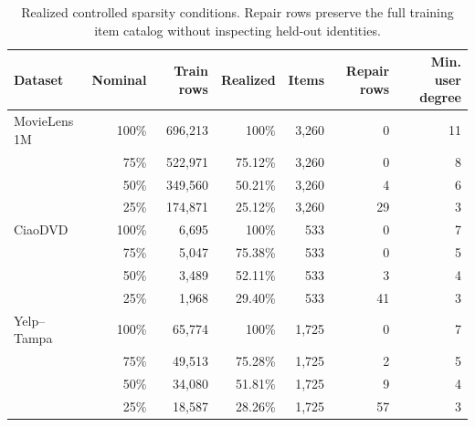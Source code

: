 \begin{table}[H]
\centering
\caption{Realized controlled sparsity conditions. Repair rows preserve the full training item catalog without inspecting held-out identities.}
\label{tab:realized-sparsity}
\small
\begin{tabular}{@{}lrrrrrr@{}}
\toprule
Dataset & Nominal & Train rows & Realized & Items & Repair rows & Min. user degree \\
\midrule
MovieLens 1M & 100\% & 696,213 & 100\% & 3,260 & 0 & 11 \\
 & 75\% & 522,971 & 75.12\% & 3,260 & 0 & 8 \\
 & 50\% & 349,560 & 50.21\% & 3,260 & 4 & 6 \\
 & 25\% & 174,871 & 25.12\% & 3,260 & 29 & 3 \\
\addlinespace
CiaoDVD & 100\% & 6,695 & 100\% & 533 & 0 & 7 \\
 & 75\% & 5,047 & 75.38\% & 533 & 0 & 5 \\
 & 50\% & 3,489 & 52.11\% & 533 & 3 & 4 \\
 & 25\% & 1,968 & 29.40\% & 533 & 41 & 3 \\
\addlinespace
Yelp--Tampa & 100\% & 65,774 & 100\% & 1,725 & 0 & 7 \\
 & 75\% & 49,513 & 75.28\% & 1,725 & 2 & 5 \\
 & 50\% & 34,080 & 51.81\% & 1,725 & 9 & 4 \\
 & 25\% & 18,587 & 28.26\% & 1,725 & 57 & 3 \\
\bottomrule
\end{tabular}
\end{table}
